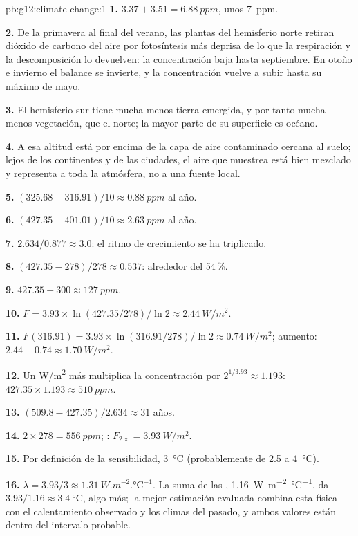 \begin{solution}{pb:g12:climate-change:1}
\textbf{1.} $3.37 + 3.51 = \qty{6.88}{ppm}$, unos \qty{7}{ppm}.

\textbf{2.} De la primavera al final del verano, las plantas del hemisferio
norte retiran dióxido de carbono del aire por fotosíntesis más deprisa de lo que
la respiración y la descomposición lo devuelven: la concentración baja hasta septiembre.
En otoño e invierno el balance se invierte, y la concentración vuelve a subir
hasta su máximo de mayo.

\textbf{3.} El hemisferio sur tiene mucha menos tierra emergida, y por tanto mucha menos
vegetación, que el norte; la mayor parte de su superficie es océano.

\textbf{4.} A esa altitud está por encima de la capa de aire contaminado cercana al
suelo; lejos de los continentes y de las ciudades, el aire que muestrea está bien mezclado y
representa a toda la atmósfera, no a una fuente local.

\textbf{5.} $(325.68 - 316.91)/10 \approx \qty{0.88}{ppm}$ al año.

\textbf{6.} $(427.35 - 401.01)/10 \approx \qty{2.63}{ppm}$ al año.

\textbf{7.} $2.634/0.877 \approx 3.0$: el ritmo de crecimiento se ha triplicado.

\textbf{8.} $(427.35 - 278)/278 \approx 0.537$: alrededor del 54\,\%.

\textbf{9.} $427.35 - 300 \approx \qty{127}{ppm}$.

\textbf{10.} $F = 3.93 \times \ln(427.35/278)/\ln 2 \approx
\qty{2.44}{W/m^2}$.

\textbf{11.} $F(316.91) = 3.93 \times \ln(316.91/278)/\ln 2 \approx
\qty{0.74}{W/m^2}$; aumento: $2.44 - 0.74 \approx \qty{1.70}{W/m^2}$.

\textbf{12.} Un \unit{W/m^2} más multiplica la concentración por
$2^{1/3.93} \approx 1.193$: $427.35 \times 1.193 \approx \qty{510}{ppm}$.

\textbf{13.} $(509.8 - 427.35)/2.634 \approx 31$ años.

\textbf{14.} $2 \times 278 = \qty{556}{ppm}$; : $F_{2\times} =
\qty{3.93}{W/m^2}$.

\textbf{15.} Por definición de la sensibilidad, \qty{3}{\degreeCelsius}
(probablemente de 2.5 a \qty{4}{\degreeCelsius}).

\textbf{16.} $\lambda = 3.93/3 \approx \qty{1.31}{W.m^{-2}.\degreeCelsius^{-1}}$.
La suma de las , \qty{1.16}{W.m^{-2}.\degreeCelsius^{-1}}, da
$3.93/1.16 \approx \qty{3.4}{\degreeCelsius}$, algo más; la mejor estimación
evaluada combina esta física con el calentamiento observado y los climas del
pasado, y ambos valores están dentro del intervalo probable.


\end{solution}
